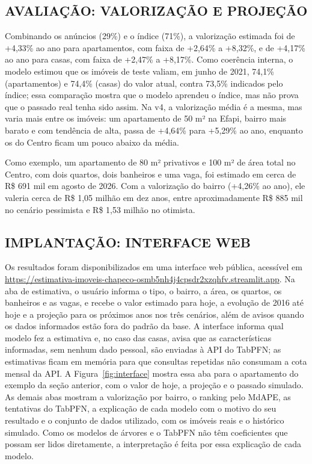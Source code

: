 \documentclass[
  article,
  a4paper,
  12pt,
  fleqn,
  oneside,
  chapter = TITLE,
  section = TITLE,
]{abntex2}
\begin{document}
\subsection{AVALIAÇÃO: VALORIZAÇÃO E PROJEÇÃO}\label{sec:valorizacao}

Combinando os anúncios (29\%) e o índice (71\%), a valorização estimada foi de +4,33\% ao ano para apartamentos, com faixa de +2,64\% a +8,32\%, e de +4,17\% ao ano para casas, com faixa de +2,47\% a +8,17\%. Como coerência interna, o modelo estimou que os imóveis de teste valiam, em junho de 2021, 74,1\% (apartamentos) e 74,4\% (casas) do valor atual, contra 73,5\% indicados pelo índice; essa comparação mostra que o modelo aprendeu o índice, mas não prova que o passado real tenha sido assim. Na v4, a valorização média é a mesma, mas varia mais entre os imóveis: um apartamento de 50 m² na Efapi, bairro mais barato e com tendência de alta, passa de +4,64\% para +5,29\% ao ano, enquanto os do Centro ficam um pouco abaixo da média.

Como exemplo, um apartamento de 80 m² privativos e 100 m² de área total no Centro, com dois quartos, dois banheiros e uma vaga, foi estimado em cerca de R\$ 691 mil em agosto de 2026. Com a valorização do bairro (+4,26\% ao ano), ele valeria cerca de R\$ 1,05 milhão em dez anos, entre aproximadamente R\$ 885 mil no cenário pessimista e R\$ 1,53 milhão no otimista.

\subsection{IMPLANTAÇÃO: INTERFACE WEB}\label{sec:interface}

Os resultados foram disponibilizados em uma interface web pública, acessível em \url{https://estimativa-imoveis-chapeco-osmb5nh4j4cpsdr2xzqhfv.streamlit.app}. Na aba de estimativa, o usuário informa o tipo, o bairro, a área, os quartos, os banheiros e as vagas, e recebe o valor estimado para hoje, a evolução de 2016 até hoje e a projeção para os próximos anos nos três cenários, além de avisos quando os dados informados estão fora do padrão da base. A interface informa qual modelo fez a estimativa e, no caso das casas, avisa que as características informadas, sem nenhum dado pessoal, são enviadas à API do TabPFN; as estimativas ficam em memória para que consultas repetidas não consumam a cota mensal da API. A Figura~\ref{fig:interface} mostra essa aba para o apartamento do exemplo da seção anterior, com o valor de hoje, a projeção e o passado simulado. As demais abas mostram a valorização por bairro, o ranking pelo MdAPE, as tentativas do TabPFN, a explicação de cada modelo com o motivo do seu resultado e o conjunto de dados utilizado, com os imóveis reais e o histórico simulado. Como os modelos de árvores e o TabPFN não têm coeficientes que possam ser lidos diretamente, a interpretação é feita por essa explicação de cada modelo.
\end{document}
